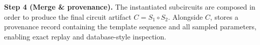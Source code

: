\textbf{Step 4 (Merge \& provenance).} The instantiated subcircuits are composed in order to produce the
final circuit artifact $C = S_1 \circ S_2$. Alongside $C$, \sys stores a provenance record containing the
template sequence and all sampled parameters, enabling exact replay and database-style inspection.

